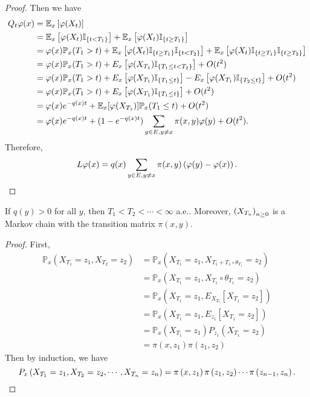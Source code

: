 \begin{proof}
    \noindent Then we have
    \begin{align*}
        Q_t\varphi(x) &= \mathbb{E}_x\left[\varphi(X_t)\right] \\
        &= \mathbb{E}_x\left[\varphi(X_t)\mathbb{I}_{\left\{t < T_1\right\}}\right] + \mathbb{E}_x\left[\varphi(X_t)\mathbb{I}_{\left\{t \geq T_1\right\}}\right] \\
        &=\varphi(x)\mathbb{P}_x(T_1 > t) + \mathbb{E}_x\left[\varphi(X_t)\mathbb{I}_{\left\{t \geq T_1\right\}}\mathbb{I}_{\left\{t < T_2\right\}}\right]+ \mathbb{E}_x\left[\varphi(X_t)\mathbb{I}_{\left\{t \geq T_1\right\}}\mathbb{I}_{\left\{t \geq T_2\right\}}\right] \\
        &= \varphi(x)\mathbb{P}_x(T_1 > t) + E_x\left[\varphi(X_{T_1})\mathbb{I}_{\left\{T_1 \leq t < T_2\right\}}\right] + O(t^2) \\
        &= \varphi(x)\mathbb{P}_x(T_1 > t) + E_x\left[\varphi(X_{T_1})\mathbb{I}_{\left\{T_1 \leq t\right\}}\right] - E_x\left[\varphi(X_{T_1})\mathbb{I}_{\left\{T_2 \leq t\right\}}\right] +O(t^2)\\
        &= \varphi(x)\mathbb{P}_x(T_1 > t) + E_x\left[\varphi(X_{T_1})\mathbb{I}_{\left\{T_1 \leq t\right\}}\right] + O(t^2) \\
        &= \varphi(x)e^{-q(x)t} + \mathbb{E}_x[\varphi(X_{T_1})]\mathbb{P}_x(T_1 \leq t) + O(t^2) \\
        &= \varphi(x)e^{-q(x)t} + (1 - e^{-q(x)t})\sum_{y\in E, y\neq x}\pi(x,y)\varphi(y)+ O(t^2).
    \end{align*}
    Therefore,
    \begin{equation*}
         L\varphi(x) = q(x)\sum_{y \in E,y\neq x}\pi(x,y)\left(\varphi(y) - \varphi(x)\right). \qedhere
    \end{equation*}
\end{proof}

\begin{thm}
    If $q(y) > 0$ for all $y$, then $T_1 < T_2 < \cdots <\infty$ a.e.. Moreover, $\left(X_{T_n}\right)_{n \geq 0}$ is a Markov chain with the transition matrix $\pi(x,y)$.
\end{thm}
\begin{proof}
    First,
    \begin{align*}
        \mathbb{P}_x\left(X_{T_1}=z_1, X_{T_2}=z_2\right) & =\mathbb{P}_x\left(X_{T_1}=z_1, X_{T_1+T_1 \circ \theta_{T_1}}=z_2\right) \\
        & =\mathbb{P}_x\left(X_{T_1}=z_1, X_{T_1} \circ \theta_{T_1}=z_2\right) \\
        & =\mathbb{P}_x\left(X_{T_1}=z_1, E_{X_{T_1}}\left[X_{T_1}=z_2\right]\right) \\
        & =\mathbb{P}_x\left(X_{T_1}=z_1, E_{z_1}\left[X_{T_1}=z_2\right]\right) \\
        & =\mathbb{P}_x\left(X_{T_1}=z_1\right) P_{z_1}\left(X_{T_1}=z_2\right) \\
        & =\pi\left(x, z_1\right) \pi\left(z_1, z_2\right)
    \end{align*}
    Then by induction, we have
    \begin{equation*}
        P_x\left(X_{T_1}=z_1, X_{T_2}=z_2, \cdots, X_{T_n}=z_n\right)=\pi\left(x, z_1\right) \pi\left(z_1, z_2\right) \cdots \pi\left(z_{n-1}, z_n\right). \qedhere
    \end{equation*}
\end{proof}

